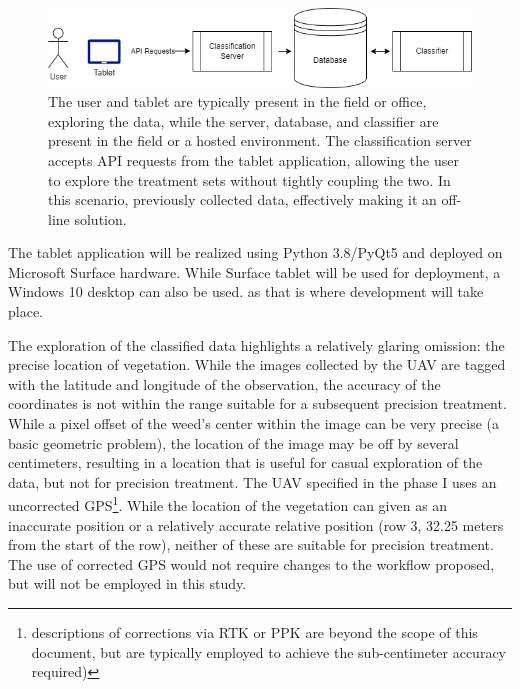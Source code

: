 \documentclass[12pt]{article}
\begin{document}
\begin{figure}[h]
	\centering
	\includegraphics[width=0.8\linewidth]{./figures/treatment-plan-explore.drawio.png}
	\caption[Exploration of the classified dataset]{The user and tablet are typically present in the field or office, exploring the data, while the server, database, and classifier are present in the field or a hosted environment. The classification server accepts API requests from the tablet application, allowing the user to explore the treatment sets without tightly coupling the two. In this scenario, previously collected data, effectively making it an off-line solution.}
	\label{fig:architecture}
\end{figure}

The tablet application will be realized using Python 3.8/PyQt5 and deployed on Microsoft Surface hardware. While Surface tablet will be used for deployment, a Windows 10 desktop can also be used. as that is where development will take place.

The exploration of the classified data highlights a relatively glaring omission: the precise location of vegetation. While the images collected by the UAV are tagged with the latitude and longitude of the observation, the accuracy of the coordinates is not within the range suitable for a subsequent precision treatment. While a pixel offset of the weed's center within the image can be very precise (a basic geometric problem), the location of the image may be off by several centimeters, resulting in a location that is useful for casual exploration of the data, but not for precision treatment.  The UAV specified in the phase I uses an uncorrected GPS\footnote{descriptions of corrections via RTK or PPK are beyond the scope of this document, but are typically employed to achieve the sub-centimeter accuracy required)}. While the location of the vegetation can given as an inaccurate position or a relatively accurate relative position (row 3, 32.25 meters from the start of the row), neither of these are suitable for precision treatment. The use of corrected GPS would not require changes to the workflow proposed, but will not be employed in this study.
 
\end{document}
